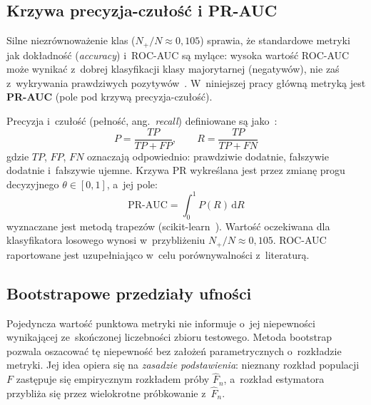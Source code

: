 \documentclass{SGGW-thesis}
\begin{document}
\subsection{Krzywa precyzja-czułość i PR-AUC}

Silne niezrównoważenie klas ($N_+ / N \approx 0{,}105$) sprawia, że standardowe metryki jak
dokładność (\textit{accuracy}) i~ROC-AUC są mylące: wysoka wartość ROC-AUC może wynikać z~dobrej
klasyfikacji klasy majorytarnej (negatywów), nie zaś z~wykrywania prawdziwych pozytywów~\cite{davis2006}.
W~niniejszej pracy główną metryką jest \textbf{PR-AUC} (pole pod krzywą precyzja-czułość).

Precyzja i~czułość (pełność, ang.\ \textit{recall}) definiowane są jako~\cite{davis2006}:
\begin{equation}
    P = \frac{TP}{TP + FP}, \qquad R = \frac{TP}{TP + FN}
    \label{eq:pr}
\end{equation}
gdzie $TP$, $FP$, $FN$ oznaczają odpowiednio: prawdziwie dodatnie, fałszywie dodatnie i~fałszywie
ujemne. Krzywa PR wykreślana jest przez zmianę progu decyzyjnego $\theta \in [0,1]$, a~jej pole:
\begin{equation}
    \mathrm{PR\text{-}AUC} = \int_0^1 P(R)\,\mathrm{d}R
    \label{eq:prauc}
\end{equation}
wyznaczane jest metodą trapezów (scikit-learn~\cite{pedregosa2011}).
Wartość oczekiwana dla klasyfikatora losowego wynosi w~przybliżeniu $N_+ / N \approx 0{,}105$.
ROC-AUC raportowane jest uzupełniająco w~celu porównywalności z~literaturą.

\subsection{Bootstrapowe przedziały ufności}

Pojedyncza wartość punktowa metryki nie informuje o~jej niepewności wynikającej ze~skończonej
liczebności zbioru testowego. Metoda bootstrap~\cite{efron1979} pozwala oszacować tę niepewność
bez założeń parametrycznych o~rozkładzie metryki. Jej idea opiera się na \textit{zasadzie
podstawienia}: nieznany rozkład populacji $F$ zastępuje się empirycznym rozkładem próby
$\hat{F}_n$, a~rozkład estymatora przybliża się przez wielokrotne próbkowanie z~$\hat{F}_n$.
\end{document}
